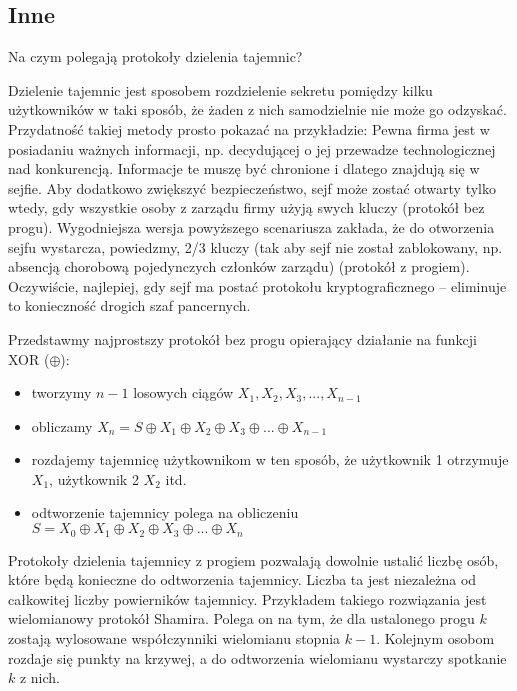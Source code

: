 \documentclass[answers,11pt]{exam}
\begin{document}
\subsection{Inne}

\begin{questions}

\question Na czym polegają protokoły dzielenia tajemnic? 
\begin{solution}
Dzielenie tajemnic jest sposobem rozdzielenie sekretu pomiędzy kilku użytkowników w taki sposób, że żaden z nich samodzielnie nie może go odzyskać. Przydatność takiej metody prosto pokazać na przykładzie: Pewna firma jest w posiadaniu ważnych informacji, np. decydującej o jej przewadze technologicznej nad konkurencją. Informacje te muszę być chronione i dlatego znajdują się w sejfie. Aby dodatkowo zwiększyć bezpieczeństwo, sejf może zostać otwarty tylko wtedy, gdy wszystkie osoby z zarządu firmy użyją swych kluczy (protokół bez progu). Wygodniejsza wersja powyższego scenariusza zakłada, że do otworzenia sejfu wystarcza, powiedzmy, 2/3 kluczy (tak aby sejf nie został zablokowany, np. absencją chorobową pojedynczych członków zarządu) (protokół z progiem). Oczywiście, najlepiej, gdy sejf ma postać protokołu kryptograficznego – eliminuje to konieczność drogich szaf pancernych.
\end{solution}

\begin{solution}
Przedstawmy najprostszy protokół bez progu opierający działanie na funkcji XOR ($\oplus$):
\begin{itemize}
\item tworzymy $n-1$ losowych ciągów $X_1, X_2, X_3, ..., X_{n-1}$
\item obliczamy $X_n = S \oplus X_1 \oplus X_2 \oplus X_3 \oplus ... \oplus X_{n-1}$ 
\item rozdajemy tajemnicę użytkownikom w ten sposób, że użytkownik 1 otrzymuje $X_1$, użytkownik 2 $X_2$ itd.
\item odtworzenie tajemnicy polega na obliczeniu $S = X_0 \oplus X_1 \oplus X_2 \oplus X_3 \oplus ... \oplus X_{n}$
\end{itemize}
\end{solution}

\begin{solution}
Protokoły dzielenia tajemnicy z progiem pozwalają dowolnie ustalić liczbę osób, które będą konieczne do odtworzenia tajemnicy. Liczba ta jest niezależna od całkowitej liczby powierników tajemnicy. Przykładem takiego rozwiązania jest wielomianowy protokół Shamira. Polega on na tym, że dla ustalonego progu $k$ zostają wylosowane współczynniki wielomianu stopnia $k-1$. Kolejnym osobom rozdaje się punkty na krzywej, a do odtworzenia wielomianu wystarczy spotkanie $k$ z nich.
\end{solution}

\end{questions}
\end{document}
